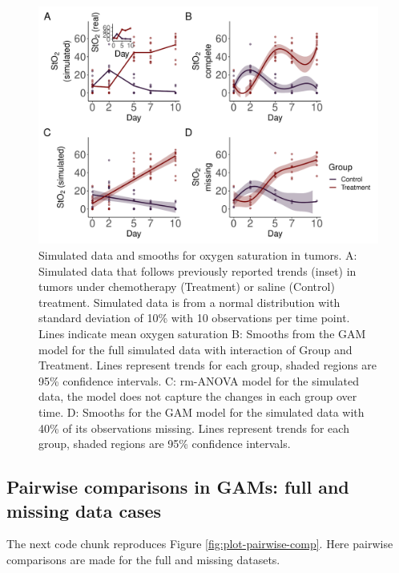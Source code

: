 \documentclass[
]{article}
\begin{document}
\begin{figure}[H]

{\centering \includegraphics[width=0.75\linewidth,]{Full_document_files/figure-latex/sim-smooth-plot-Appendix-1} 

}

\caption{Simulated data and smooths for oxygen saturation in tumors. A: Simulated data that follows previously reported trends (inset) in tumors under chemotherapy (Treatment) or saline (Control) treatment. Simulated data is from a normal distribution with standard deviation of 10\% with 10 observations per time point. Lines indicate mean oxygen saturation B: Smooths from the GAM model for the full simulated data with interaction of Group and Treatment. Lines represent trends for each group, shaded regions are 95\% confidence intervals. C: rm-ANOVA model for the simulated data, the model does not capture the changes in each group over time. D: Smooths for the GAM model for the simulated data with 40\% of its observations missing. Lines represent trends for each group, shaded regions are 95\% confidence intervals.}\label{fig:sim-smooth-plot-Appendix}
\end{figure}

\hypertarget{pairwise-comparisons-in-gams-full-and-missing-data-cases}{%
\subsection{Pairwise comparisons in GAMs: full and missing data cases}\label{pairwise-comparisons-in-gams-full-and-missing-data-cases}}

The next code chunk reproduces Figure \ref{fig:plot-pairwise-comp}. Here pairwise comparisons are made for the full and missing datasets.
\end{document}
